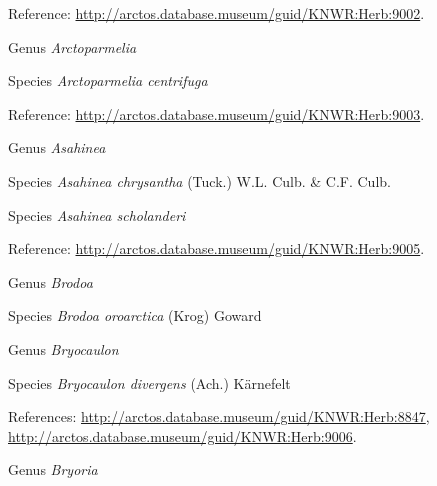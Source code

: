 \documentclass[9pt, article]{memoir}
\begin{document}
\begin{multicols}{2}
\vspace{6pt}Reference: 
\url{http://arctos.database.museum/guid/KNWR:Herb:9002}.

\vspace{6pt}\noindent\hspace{30pt}Genus \textit{Arctoparmelia}


\vspace{6pt}\noindent\hspace{36pt}Species \textit{Arctoparmelia centrifuga}


\vspace{6pt}Reference: 
\url{http://arctos.database.museum/guid/KNWR:Herb:9003}.

\vspace{6pt}\noindent\hspace{30pt}Genus \textit{Asahinea}


\vspace{6pt}\noindent\hspace{36pt}Species \textit{Asahinea chrysantha} (Tuck.) W.L. Culb. \& C.F. Culb.


\vspace{6pt}\noindent\hspace{36pt}Species \textit{Asahinea scholanderi}


\vspace{6pt}Reference: 
\url{http://arctos.database.museum/guid/KNWR:Herb:9005}.

\vspace{6pt}\noindent\hspace{30pt}Genus \textit{Brodoa}


\vspace{6pt}\noindent\hspace{36pt}Species \textit{Brodoa oroarctica} (Krog) Goward


\vspace{6pt}\noindent\hspace{30pt}Genus \textit{Bryocaulon}


\vspace{6pt}\noindent\hspace{36pt}Species \textit{Bryocaulon divergens} (Ach.) Kärnefelt


\vspace{6pt}References: 
\url{http://arctos.database.museum/guid/KNWR:Herb:8847}, 
\url{http://arctos.database.museum/guid/KNWR:Herb:9006}.

\vspace{6pt}\noindent\hspace{30pt}Genus \textit{Bryoria}



\end{multicols}
\end{document}
